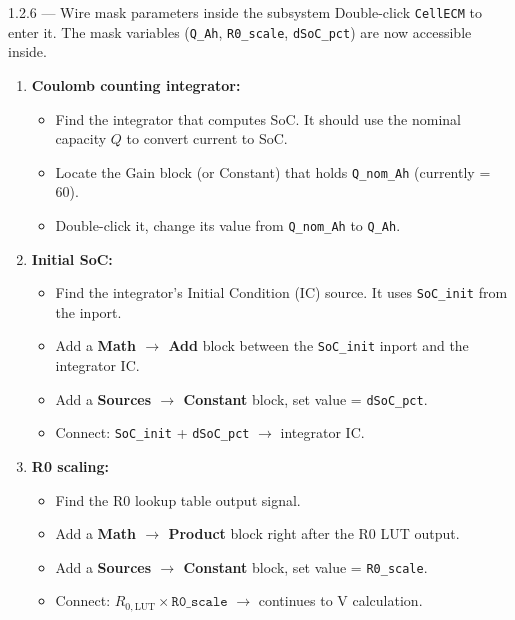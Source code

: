 \documentclass[11pt,a4paper]{article}
\begin{document}
\begin{guistep}{1.2.6 — Wire mask parameters inside the subsystem}
Double-click \texttt{CellECM} to enter it. The mask variables (\texttt{Q\_Ah}, \texttt{R0\_scale}, \texttt{dSoC\_pct}) are now accessible inside.
\begin{enumerate}
    \item \textbf{Coulomb counting integrator:}
    \begin{itemize}
        \item Find the integrator that computes SoC. It should use the nominal capacity $Q$ to convert current to SoC.
        \item Locate the Gain block (or Constant) that holds \texttt{Q\_nom\_Ah} (currently = 60).
        \item Double-click it, change its value from \texttt{Q\_nom\_Ah} to \texttt{Q\_Ah}.
    \end{itemize}

    \item \textbf{Initial SoC:}
    \begin{itemize}
        \item Find the integrator's Initial Condition (IC) source. It uses \texttt{SoC\_init} from the inport.
        \item Add a \textbf{Math $\to$ Add} block between the \texttt{SoC\_init} inport and the integrator IC.
        \item Add a \textbf{Sources $\to$ Constant} block, set value = \texttt{dSoC\_pct}.
        \item Connect: \texttt{SoC\_init} + \texttt{dSoC\_pct} $\to$ integrator IC.
    \end{itemize}

    \item \textbf{R0 scaling:}
    \begin{itemize}
        \item Find the R0 lookup table output signal.
        \item Add a \textbf{Math $\to$ Product} block right after the R0 LUT output.
        \item Add a \textbf{Sources $\to$ Constant} block, set value = \texttt{R0\_scale}.
        \item Connect: $R_{0,\text{LUT}} \times \texttt{R0\_scale}$ $\to$ continues to V calculation.
    \end{itemize}
\end{enumerate}
\end{guistep}
\end{document}
